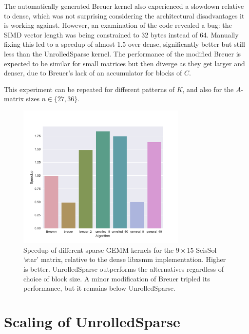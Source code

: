 The automatically generated Breuer kernel also experienced a slowdown relative to dense, which was not surprising considering the architectural disadvantages it is working against. However, an examination of the code revealed a bug: the SIMD vector length was being constrained to 32 bytes instead of 64. Manually fixing this led to a speedup of almost $1.5$ over dense, significantly better but still less than the UnrolledSparse kernel. The performance of the modified Breuer is expected to be similar for small matrices but then diverge as they get larger and denser, due to Breuer's lack of an accumulator for blocks of $C$. 

This experiment can be repeated for different patterns of $K$, and also for the $A$-matrix sizes $n \in \{27, 36\}$. 

  \begin{figure}[H]
    \centering
      \includegraphics[width=0.75\textwidth]{images/seissol_comparison.pdf}
      \caption{Speedup of different sparse GEMM kernels for the $9\times 15$ SeisSol `star' matrix, relative to the dense libxsmm implementation. Higher is better. UnrolledSparse outperforms the alternatives regardless of choice of block size. A minor modification of Breuer tripled its performance, but it remains below UnrolledSparse. }
      \label{fig:perf_seissol}
  \end{figure}


\section{Scaling of UnrolledSparse}
\label{section:exp_unrolled_scaling}

